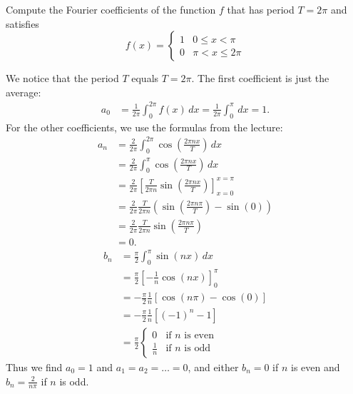 \documentclass[11pt]{article}
\begin{document}

\begin{exercise}
    Compute the Fourier coefficients of the function $f$ that has period $T = 2\pi$ and satisfies
    \[
        f(x) = \left\{\begin{array}{ll} 1 & 0 \leq x < \pi \\ 0 & \pi < x \leq 2\pi \end{array}\right.
    \]
\end{exercise}
\begin{solution}     
    We notice that the period $T$ equals $T = 2\pi$. 
    The first coefficient is just the average:
    \begin{align*}
        a_0 
        &= 
        \frac{1}{2\pi} \int_0^{2\pi} f(x) \, dx 
        = 
        \frac{1}{2\pi} \int_0^\pi \, dx  = 1
        .
    \end{align*}
    For the other coefficients, we use the formulas from the lecture:
    \begin{align*}
        a_n 
        &= 
        \frac{2}{2\pi} \int_0^{2\pi} \cos\left(\frac{2\pi n x}{T}\right) \, dx 
        \\&= 
        \frac{2}{2\pi} \int_0^\pi \cos\left(\frac{2\pi n x}{T}\right) \, dx 
        \\
        &= 
        \frac{2}{2\pi} \left[ \frac{T}{2\pi n} \sin\left(\frac{2\pi n x}{T}\right) \right]_{x=0}^{x=\pi}
        \\&= 
        \frac{2}{2\pi} \frac{T}{2\pi n} \left( \sin\left(\frac{2\pi n \pi}{T}\right) - \sin(0) \right) 
        \\&= 
        \frac{2}{2\pi} \frac{T}{2\pi n} \sin\left(\frac{2\pi n \pi}{T}\right) 
        \\&= 
        0.
    \end{align*}
    \begin{align*}
        b_n 
        &= 
        \frac{\pi}{2}
        \int_0^\pi \sin(nx) \, dx 
        \\
        &= 
        \frac{\pi}{2}
        \left[-\frac{1}{n} \cos(nx)\right]_0^\pi 
        \\
        &= 
        -\frac{\pi}{2}
        \frac{1}{n} \left[ \cos(n\pi) - \cos(0) \right] 
        \\
        &= 
        -
        \frac{\pi}{2}
        \frac{1}{n} \left[ (-1)^n - 1 \right] 
        \\
        &= 
        \frac{\pi}{2}
        \begin{cases}
            0 & \text{if } n \text{ is even} 
            \\
            \frac{1}{n} & \text{if } n \text{ is odd}
        \end{cases}
    \end{align*}
    Thus we find $a_0 = 1$ and $a_1 = a_2 = \dots = 0$,
    and either $b_n = 0$ if $n$ is even and $b_n = \frac{2}{n\pi}$ if $n$ is odd. 
\end{solution}
\end{document}
